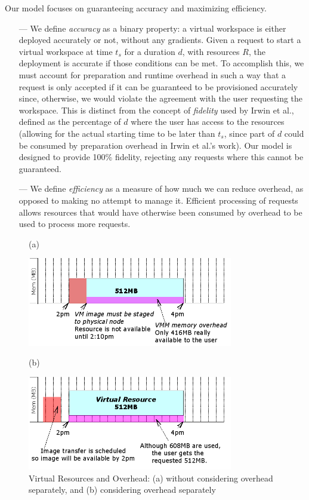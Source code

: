 Our model focuses on guaranteeing accuracy and maximizing efficiency. 
\begin{itemize}
\item[---] We define \emph{accuracy} as a binary property: a virtual workspace is either deployed accurately or not, without any gradients. Given a request to start a virtual workspace at time $t_s$ for a duration $d$, with resources $R$, the deployment is accurate if those conditions can be met. To accomplish this, we must account for preparation and runtime overhead in such a way that a request is only accepted if it can be guaranteed to be provisioned accurately since, otherwise, we would violate the agreement with the user requesting the workspace. This is distinct from the concept of \emph{fidelity} used by Irwin et al.\cite{BorjaCite10}, defined as the percentage of $d$ where the user has access to the resources (allowing for the actual starting time to be later than $t_s$, since part of $d$ could be consumed by preparation overhead in Irwin et al.'s work). Our model is designed to provide 100\% fidelity, rejecting any requests where this cannot be guaranteed. 
\item[---] We define \emph{efficiency} as a measure of how much we can reduce overhead, as opposed to making no attempt to manage it. Efficient processing of requests allows resources that would have otherwise been consumed by overhead to be used to process more requests. 
\end{itemize}

\begin{figure}
  \begin{center}
(a)

    \includegraphics[width=0.8\textwidth]{figures/virtualresources_a.png}

\vspace{3em}
(b)

    \includegraphics[width=0.8\textwidth]{figures/virtualresources_b.png}



    \caption{Virtual Resources and Overhead: (a) without considering overhead separately, and (b) considering overhead separately}
	\label{fig:virtualresources}
  \end{center}
\end{figure}

